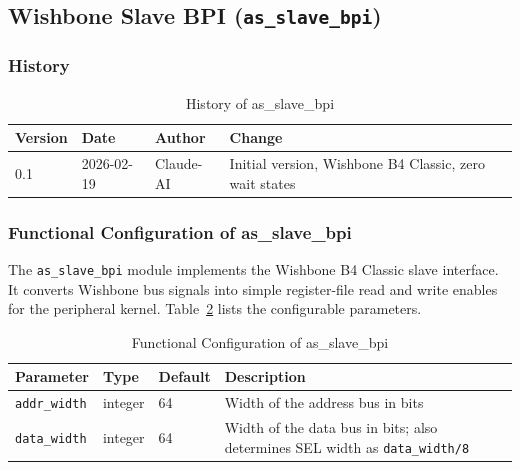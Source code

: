 \subsection{Wishbone Slave BPI (\texttt{as\_slave\_bpi})}
\label{subsec:asSlaveBpi}

\subsubsection{History}
\begin{table}[H]
\caption{History of as\_slave\_bpi}
\label{tab:asSlaveBpiHist}
\centering
\begin{tabularx}{\textwidth}{|l |l |l |X|}
  \hline
  Version & Date & Author & Change \\
  \hline
  \hline
  0.1 & 2026-02-19 & Claude-AI & Initial version, Wishbone B4 Classic, zero wait states \\
  \hline
\end{tabularx}
\end{table}

\subsubsection{Functional Configuration of as\_slave\_bpi}

The \texttt{as\_slave\_bpi} module implements the Wishbone B4 Classic
slave interface.
It converts Wishbone bus signals into simple register-file read and write
enables for the peripheral kernel.
Table~\ref{tab:asSlaveBpiCfg} lists the configurable parameters.

\begin{table}[H]
\caption{Functional Configuration of as\_slave\_bpi}
\label{tab:asSlaveBpiCfg}
\centering
\begin{tabularx}{\textwidth}{|l |l |l |X|}
  \hline
  Parameter & Type & Default & Description \\
  \hline
  \hline
  \texttt{addr\_width} & integer & 64 & Width of the address bus in bits \\
  \hline
  \texttt{data\_width} & integer & 64 & Width of the data bus in bits; also determines SEL width as \texttt{data\_width/8} \\
  \hline
\end{tabularx}
\end{table}

